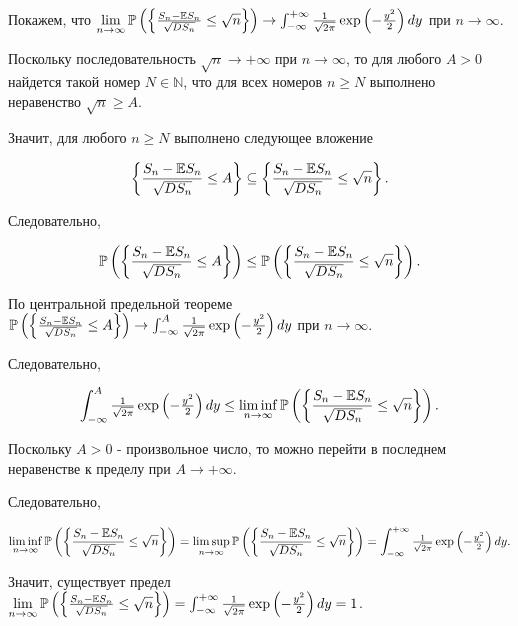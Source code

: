 Покажем, что $\mathop{\lim }\limits_{n\to \infty } {\rm {\mathbb P}}\left(\left\{\frac{S_{n} -{\rm {\mathbb E}}S_{n} }{\sqrt{DS_{n} } } \le \sqrt{n} \right\}\right)\to \int _{-\infty }^{+\infty }{\tfrac{1}{\sqrt{2\pi } }} \exp \left(-{\tfrac{y^{2} }{2}} \right)dy $ при $n\to \infty $.

Поскольку последовательность $\sqrt{n} \to +\infty $ при $n\to \infty $, то для любого $A>0$ найдется такой номер $N\in {\mathbb N}$, что для всех номеров $n\ge N$ выполнено неравенство $\sqrt{n} \ge A$.

Значит, для любого $n\ge N$ выполнено следующее вложение

\[\left\{\frac{S_{n} -{\rm {\mathbb E}}S_{n} }{\sqrt{DS_{n} } } \le A\right\}\subseteq \left\{\frac{S_{n} -{\rm {\mathbb E}}S_{n} }{\sqrt{DS_{n} } } \le \sqrt{n} \right\}.\] 

Следовательно,

\[{\rm {\mathbb P}}\left(\left\{\frac{S_{n} -{\rm {\mathbb E}}S_{n} }{\sqrt{DS_{n} } } \le A\right\}\right)\le {\rm {\mathbb P}}\left(\left\{\frac{S_{n} -{\rm {\mathbb E}}S_{n} }{\sqrt{DS_{n} } } \le \sqrt{n} \right\}\right).\] 

По центральной предельной теореме ${\rm {\mathbb P}}\left(\left\{\frac{S_{n} -{\rm {\mathbb E}}S_{n} }{\sqrt{DS_{n} } } \le A\right\}\right)\to \int _{-\infty }^{A}{\tfrac{1}{\sqrt{2\pi } }} \exp \left(-{\tfrac{y^{2} }{2}} \right)dy $ при $n\to \infty $.

Следовательно,

\[\int _{-\infty }^{A}{\tfrac{1}{\sqrt{2\pi } }} \exp \left(-{\tfrac{y^{2} }{2}} \right)dy \le \mathop{\lim \inf }\limits_{n\to \infty } {\rm {\mathbb P}}\left(\left\{\frac{S_{n} -{\rm {\mathbb E}}S_{n} }{\sqrt{DS_{n} } } \le \sqrt{n} \right\}\right).\] 

Поскольку $A>0$ - произвольное число, то можно перейти в последнем неравенстве к пределу при $A\to +\infty $.

Следовательно,

\[\mathop{\lim \inf }\limits_{n\to \infty } {\rm {\mathbb P}}\left(\left\{\frac{S_{n} -{\rm {\mathbb E}}S_{n} }{\sqrt{DS_{n} } } \le \sqrt{n} \right\}\right)=\mathop{\lim \sup }\limits_{n\to \infty } {\rm {\mathbb P}}\left(\left\{\frac{S_{n} -{\rm {\mathbb E}}S_{n} }{\sqrt{DS_{n} } } \le \sqrt{n} \right\}\right)=\int _{-\infty }^{+\infty }{\tfrac{1}{\sqrt{2\pi } }} \exp \left(-{\tfrac{y^{2} }{2}} \right)dy .\] 

Значит, существует предел $\mathop{\lim }\limits_{n\to \infty } {\rm {\mathbb P}}\left(\left\{\frac{S_{n} -{\rm {\mathbb E}}S_{n} }{\sqrt{DS_{n} } } \le \sqrt{n} \right\}\right)=\int _{-\infty }^{+\infty }{\tfrac{1}{\sqrt{2\pi } }} \exp \left(-{\tfrac{y^{2} }{2}} \right)dy =1$.

